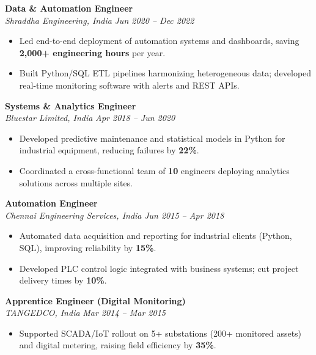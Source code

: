 \documentclass[10pt,a4paper]{article}
\newcommand{\job}[3]{%
    {\fontsize{11}{13}\selectfont\textbf{#1}}\\
    \textsl{\color{lighttext}#2} \hfill \textit{\color{lighttext}#3}
}
\begin{document}
\begin{minipage}[t]{14.0cm}
    \job{Data \& Automation Engineer}{Shraddha Engineering, India}{Jun 2020 -- Dec 2022}
    \begin{itemize}[leftmargin=0.6cm, label={\color{accentblue}$\bullet$}]
        \item Led end-to-end deployment of automation systems and dashboards, saving \textbf{2,000+ engineering hours} per year.
        \item Built Python/SQL ETL pipelines harmonizing heterogeneous data; developed real-time monitoring software with alerts and REST APIs.
    \end{itemize}
    \vspace{0.02cm}

    \job{Systems \& Analytics Engineer}{Bluestar Limited, India}{Apr 2018 -- Jun 2020}
    \begin{itemize}[leftmargin=0.6cm, label={\color{accentblue}$\bullet$}]
        \item Developed predictive maintenance and statistical models in Python for industrial equipment, reducing failures by \textbf{22\%}.
        \item Coordinated a cross-functional team of \textbf{10} engineers deploying analytics solutions across multiple sites.
    \end{itemize}
    \vspace{0.02cm}

    \job{Automation Engineer}{Chennai Engineering Services, India}{Jun 2015 -- Apr 2018}
    \begin{itemize}[leftmargin=0.6cm, label={\color{accentblue}$\bullet$}]
        \item Automated data acquisition and reporting for industrial clients (Python, SQL), improving reliability by \textbf{15\%}.
        \item Developed PLC control logic integrated with business systems; cut project delivery times by \textbf{10\%}.
    \end{itemize}
    \vspace{0.02cm}

    \job{Apprentice Engineer \textmd{(Digital Monitoring)}}{TANGEDCO, India}{Mar 2014 -- Mar 2015}
    \begin{itemize}[leftmargin=0.6cm, label={\color{accentblue}$\bullet$}]
        \item Supported SCADA/IoT rollout on 5+ substations (200+ monitored assets) and digital metering, raising field efficiency by \textbf{35\%}.
    \end{itemize}


\end{minipage}
\end{document}
